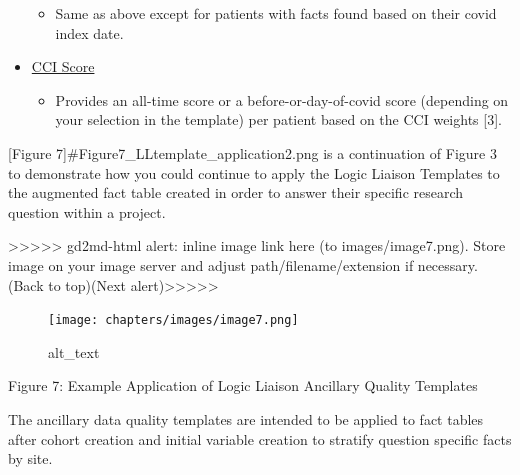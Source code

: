 \documentclass[
  letterpaper,
  DIV=11,
  numbers=noendperiod]{scrreprt}
\providecommand{\tightlist}{%
  \setlength{\itemsep}{0pt}\setlength{\parskip}{0pt}}\usepackage{longtable,booktabs,array}
\begin{document}
\begin{itemize}
  \begin{itemize}
  \tightlist
  \item
    Same as above except for patients with facts found based on their
    covid index date.
  \end{itemize}
\item
  \href{https://unite.nih.gov/workspace/module/view/latest/ri.workshop.main.module.3ab34203-d7f3-482e-adbd-f4113bfd1a2b?id=KO-06D5DA0\&view=focus}{CCI
  Score}

  \begin{itemize}
  \tightlist
  \item
    Provides an all-time score or a before-or-day-of-covid score
    (depending on your selection in the template) per patient based on
    the CCI weights {[}3{]}.
  \end{itemize}
\end{itemize}

{[}Figure 7{]}\#Figure7\_LLtemplate\_application2.png is a continuation
of Figure 3 to demonstrate how you could continue to apply the Logic
Liaison Templates to the augmented fact table created in order to answer
their specific research question within a project.

{\textgreater\textgreater\textgreater\textgreater\textgreater{}
gd2md-html alert: inline image link here (to images/image7.png). Store
image on your image server and adjust path/filename/extension if
necessary. }(Back to top)(Next
alert){\textgreater\textgreater\textgreater\textgreater\textgreater{} }

\begin{figure}

{\centering \texttt{[image: chapters/images/image7.png]}

}

\caption{alt\_text}

\end{figure}

Figure 7: Example Application of Logic Liaison Ancillary Quality
Templates

The ancillary data quality templates are intended to be applied to fact
tables after cohort creation and initial variable creation to stratify
question specific facts by site.
\end{document}
